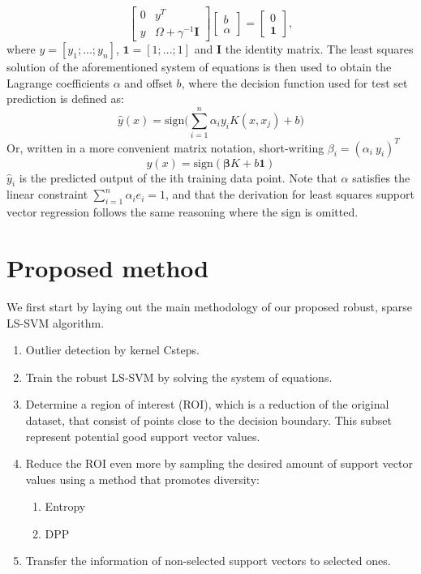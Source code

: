 \documentclass[preprint,12pt]{elsarticle}
\begin{document}
	\begin{equation}
	\begin{bmatrix}
	0 & y^T \\
	y & \Omega + \gamma^{-1} \mathbf{I}
	\end{bmatrix}	
	\begin{bmatrix}
	b \\
	\alpha
	\end{bmatrix}
	=
	\begin{bmatrix}
	0 \\
	\mathbf{1}
	\end{bmatrix},
	\end{equation}
	where $y = [y_1;...;y_n]$, $\mathbf{1} = [1;...;1]$ and $\mathbf{I}$ the identity matrix.
	The least squares solution of the aforementioned system of equations is then used to  obtain the Lagrange coefficients $\alpha$ and offset $b$, where the decision function used for test set prediction is defined as:
	\begin{equation}
	\hat{y}(x) = \mathrm{sign}\Big(\sum_{i=1}^{n} \alpha_i y_i K(x, x_j) + b\Big)	
	\label{eq:classification}
	\end{equation}
	Or, written in a more convenient matrix notation, short-writing $\beta_i= (\alpha_i \  y_i)^T$
	\begin{equation}
	\hat{y}(x) = \mathrm{sign}(\mathbf{\beta} K + b \mathbf{1})
	\label{eq:prediction}
	\end{equation}
	$\hat{y}_i$ is the predicted output of the ith training data point. Note that $\alpha$ satisfies the linear constraint $\sum_{i=1}^{n} \alpha_i  e_i = 1$, and that the derivation for least squares support vector regression follows the same reasoning where the sign is omitted. %
	
	\newpage
	
	\section{Proposed method}
	We first start by laying out the main methodology of our proposed robust, sparse LS-SVM algorithm. 
	\begin{enumerate}
		\item Outlier detection by kernel Csteps.
		\item Train the robust LS-SVM by solving the system of equations.
		\item Determine a region of interest (ROI), which is a reduction of the original dataset, that consist of points close to the decision boundary. This subset represent potential good support vector values.
		\item Reduce the ROI even more by sampling the desired amount of support vector values using a method that promotes diversity:
		\begin{enumerate}
			\item Entropy
			\item DPP
		\end{enumerate}
		\item Transfer the information of non-selected support vectors to selected ones.
	\end{enumerate} 
	
\end{document}
